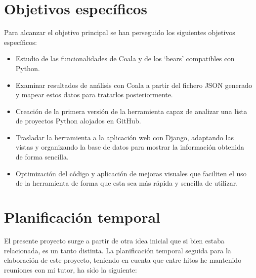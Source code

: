 \documentclass[a4paper, 12pt]{book}
\begin{document}
\section{Objetivos específicos}
\label{sec:objetivos-especificos}
Para alcanzar el objetivo principal se han perseguido los siguientes objetivos específicos:
\begin{itemize}
  \item Estudio de las funcionalidades de Coala y de los `bears' compatibles con Python.
  \item Examinar resultados de análisis con Coala a partir del fichero JSON generado y mapear estos datos para tratarlos posteriormente.
  \item Creación de la primera versión de la herramienta capaz de analizar una lista de proyectos Python alojados en GitHub.
  \item Trasladar la herramienta a la aplicación web con Django, adaptando las vistas y organizando la base de datos para mostrar la información obtenida de forma sencilla.
  \item Optimización del código y aplicación de mejoras visuales que faciliten el uso de la herramienta de forma que esta sea más rápida y sencilla de utilizar.
\end{itemize}


\section{Planificación temporal}
\label{sec:planificacion-temporal}
El presente proyecto surge a partir de otra idea inicial que si bien estaba relacionada, es un tanto distinta. La planificación temporal seguida para la elaboración de este proyecto, teniendo en cuenta que entre hitos he mantenido reuniones con mi tutor, ha sido la siguiente:
\end{document}
